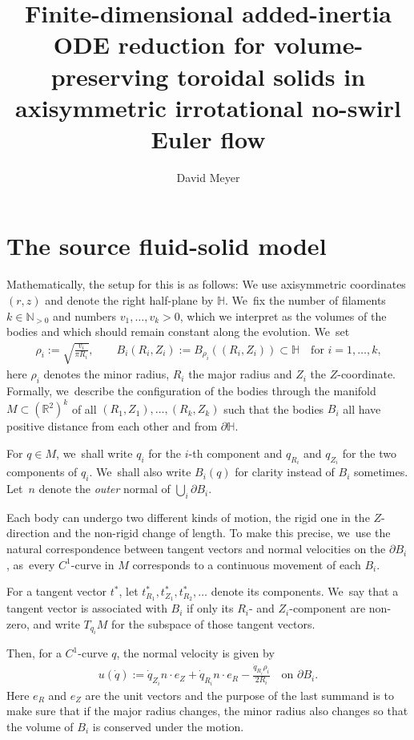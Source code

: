 \documentclass[10pt]{amsart}
\theoremstyle{definition}
\newcommand\R{\mathbb{R}}
\newcommand\N{\mathbb{N}}
\newcommand\eq{=}
\let\de\partial
\begin{document}
\title{Finite-dimensional added-inertia ODE reduction for volume-preserving toroidal solids in axisymmetric irrotational no-swirl Euler flow}
\author{David Meyer}
\maketitle
\section{The source fluid-solid model}
Mathematically, the setup for this is as follows: We use axisymmetric coordinates $(r,z)$ and denote the right half-plane by $\mathbb{H}$. We~fix the number of filaments $k\in \N_{>0}$ and numbers $v_1,\dots, v_k>0$, which we interpret as the volumes of the bodies and which should remain constant along the evolution. We~set
\begin{align}
\rho_i:=\sqrt{\frac{v_i}{\pi R_i}},\qquad B_i(R_i,Z_i):=B_{\rho_i}((R_i,Z_i))\subset\mathbb{H} \quad\text{for $i\eq1,\dots,k$,}\label{def rho}
\end{align}
here $\rho_i$ denotes the minor radius, $R_i$ the major radius and $Z_i$ the $Z$-coordinate.
Formally, we~describe the configuration of the bodies through the manifold $M\subset (\R^2)^k$ of all $(R_1,Z_1),\dots, (R_k,Z_k)$ such that the bodies $B_i$ all have positive distance from each other and from $\de\mathbb{H}$.

For $q\in M$, we~shall write $q_i$ for the $i$-th component and $q_{R_i}$ and $q_{Z_i}$ for the two components of $q_i$. We~shall also write $B_i(q)$ for clarity instead of $B_i$ sometimes. Let~$n$ denote the \textit{outer} normal of $\bigcup_i\de B_i$.

Each body can undergo two different kinds of motion, the rigid one in the $Z$\nobreakdash-direction and the non-rigid change of length. To make this precise, we~use the natural correspondence between tangent vectors and normal velocities on the $\de B_i$, as~every $C^1$-curve in $M$ corresponds to a continuous movement of each $B_i$.

For a tangent vector $t^*$, let $t_{R_1}^*,t_{Z_1}^*,t_{R_2}^*,\dots$ denote its components. We~say that a tangent vector is associated with $B_i$ if only its $R_i$- and $Z_i$-component are non-zero, and write $T_{q_i}M$ for the subspace of those tangent vectors.

Then, for a $C^1$-curve $q$, the normal velocity is given by
\begin{align}
u(\dot{q}):=\dot{q}_{Z_i}n\cdot e_Z+\dot{q}_{R_i}n\cdot e_R-\frac{\dot{q}_{R_i}\rho_i}{2R_i}\quad\text{on $\de B_i$.}\label{normal velo}
\end{align}
Here $e_R$ and $e_Z$ are the unit vectors and the purpose of the last summand is to make sure that if the major radius changes, the minor radius also changes so that the volume of $B_i$ is conserved under the motion.
\end{document}
